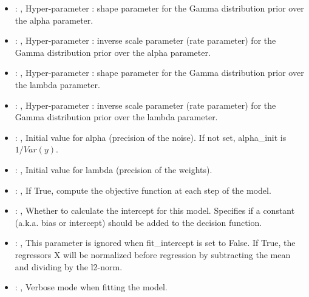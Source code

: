 \begin{itemize}
    \item {}: , 
      Hyper-parameter : shape parameter for the Gamma
      distribution prior over the alpha parameter.

    \item {}: , 
      Hyper-parameter : inverse scale parameter (rate parameter)
      for the Gamma distribution prior over the alpha parameter.

    \item {}: , 
      Hyper-parameter : shape parameter for the Gamma distribution
      prior over the lambda parameter.

    \item {}: , 
      Hyper-parameter : inverse scale parameter (rate parameter) for
      the Gamma distribution prior over the lambda parameter.

    \item {}: , 
      Initial value for alpha (precision of the noise).
      If not set, alpha\_init is $1/Var(y)$.

    \item {}: , 
      Initial value for lambda (precision of the weights).

    \item {}: , 
      If True, compute the objective function at each step of the
      model.

    \item {}: , 
      Whether to calculate the intercept for this model. Specifies if a constant (a.k.a. bias or
      intercept)                                                   should be added to the decision
      function.

    \item {}: , 
      This parameter is ignored when fit\_intercept is set to False. If True,
      the regressors X will be normalized before regression by subtracting the mean and
      dividing by the l2-norm.

    \item {}: , 
      Verbose mode when fitting the model.
  \end{itemize}


